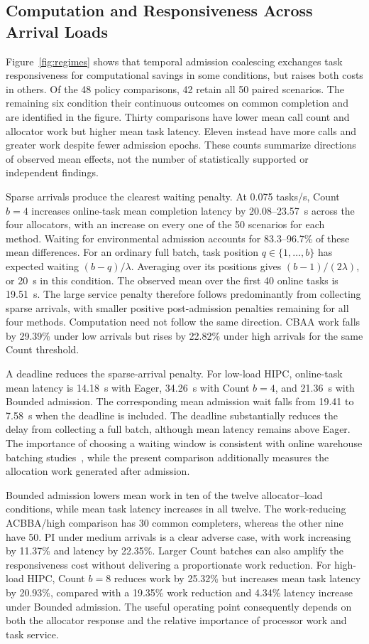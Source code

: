 \documentclass[conference]{IEEEtran}
\begin{document}
\subsection{Computation and Responsiveness Across Arrival Loads}
\label{sec:regimes}
Figure~\ref{fig:regimes} shows that temporal admission coalescing exchanges task responsiveness for computational savings in some conditions, but raises both costs in others. Of the 48 policy comparisons, 42 retain all 50 paired scenarios. The remaining six condition their continuous outcomes on common completion and are identified in the figure. Thirty comparisons have lower mean call count and allocator work but higher mean task latency. Eleven instead have more calls and greater work despite fewer admission epochs. These counts summarize directions of observed mean effects, not the number of statistically supported or independent findings.

Sparse arrivals produce the clearest waiting penalty. At 0.075 tasks/s, Count $b=4$ increases online-task mean completion latency by 20.08--23.57~s across the four allocators, with an increase on every one of the 50 scenarios for each method. Waiting for environmental admission accounts for 83.3--96.7\% of these mean differences. For an ordinary full batch, task position $q\in\{1,\ldots,b\}$ has expected waiting $(b-q)/\lambda$. Averaging over its positions gives $(b-1)/(2\lambda)$, or 20~s in this condition. The observed mean over the first 40 online tasks is 19.51~s. The large service penalty therefore follows predominantly from collecting sparse arrivals, with smaller positive post-admission penalties remaining for all four methods. Computation need not follow the same direction. CBAA work falls by 29.39\% under low arrivals but rises by 22.82\% under high arrivals for the same Count threshold.

A deadline reduces the sparse-arrival penalty. For low-load HIPC, online-task mean latency is 14.18~s with Eager, 34.26~s with Count $b=4$, and 21.36~s with Bounded admission. The corresponding mean admission wait falls from 19.41 to 7.58~s when the deadline is included. The deadline substantially reduces the delay from collecting a full batch, although mean latency remains above Eager. The importance of choosing a waiting window is consistent with online warehouse batching studies~\cite{gilborras2024window}, while the present comparison additionally measures the allocation work generated after admission.

Bounded admission lowers mean work in ten of the twelve allocator--load conditions, while mean task latency increases in all twelve. The work-reducing ACBBA/high comparison has 30 common completers, whereas the other nine have 50. PI under medium arrivals is a clear adverse case, with work increasing by 11.37\% and latency by 22.35\%. Larger Count batches can also amplify the responsiveness cost without delivering a proportionate work reduction. For high-load HIPC, Count $b=8$ reduces work by 25.32\% but increases mean task latency by 20.93\%, compared with a 19.35\% work reduction and 4.34\% latency increase under Bounded admission. The useful operating point consequently depends on both the allocator response and the relative importance of processor work and task service.
\end{document}
